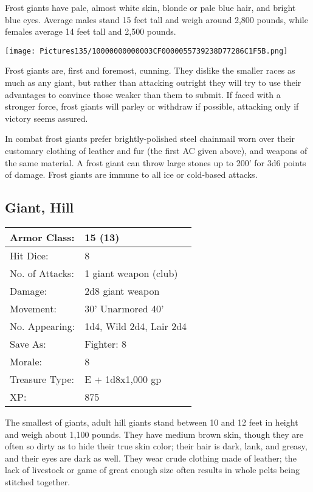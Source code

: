 \documentclass[a4paper,twoside,openany,10pt]{book}
\begin{document}
\begin{multicols}{2}
Frost giants have pale, almost white skin, blonde or pale blue hair, and bright blue eyes. Average males stand 15 feet tall and weigh around 2,800 pounds, while females average 14 feet tall and 2,500 pounds.


\begin{center}
	\texttt{[image: Pictures135/10000000000003CF0000055739238D77286C1F5B.png]}
\end{center}

Frost giants are, first and foremost, cunning. They dislike the smaller races as much as any giant, but rather than attacking outright they will try to use their advantages to convince those weaker than them to submit. If faced with a stronger force, frost giants will parley or withdraw if possible, attacking only if victory seems assured.

In combat frost giants prefer brightly-polished steel chainmail worn over their customary clothing of leather and fur (the first AC given above), and weapons of the same material. A frost giant can throw large stones up to 200' for 3d6 points of damage. Frost giants are immune to all ice or cold-based attacks.


\subsection*{Giant, Hill}\label{giant-hill}

\begin{tabularx}{0.48\textwidth}{@{}lX@{}}
Armor Class: & 15 (13) \\\hline
Hit Dice: & 8 \\\hline
No. of Attacks: & 1 giant weapon (club) \\\hline
Damage: & 2d8 giant weapon \\\hline
Movement: & 30' Unarmored 40' \\\hline
No. Appearing: & 1d4, Wild 2d4, Lair 2d4 \\\hline
Save As: & Fighter: 8 \\\hline
Morale: & 8 \\\hline
Treasure Type: & E + 1d8x1,000 gp \\\hline
XP: & 875 \\\hline
\end{tabularx}\medskip

The
smallest of giants, adult hill giants stand between 10 and 12 feet in height and weigh about 1,100 pounds. They have medium brown skin, though they are often so dirty as to hide their true skin color; their hair is dark, lank, and greasy, and their eyes are dark as well. They wear crude clothing made of leather; the lack of livestock or game of great enough size often results in whole pelts being stitched together.


\end{multicols}
\end{document}
